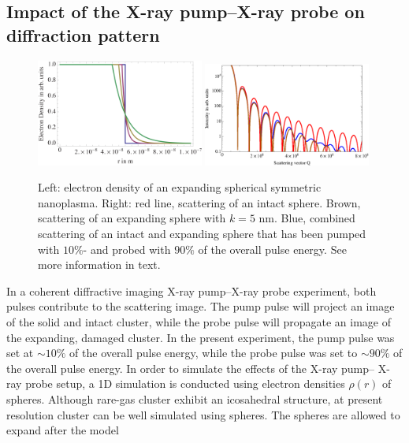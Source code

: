 \subsection{Impact of the X-ray pump--X-ray probe on diffraction pattern}\label{sec:pump--probe-considerations}
\begin{figure}
	\centering
		\includegraphics[width=0.49\textwidth]{images/electron-density-convoluted-object.png}
		\includegraphics[width=0.49\textwidth]{images/beam-convoluted-with-object.eps}
	\caption[Influence of X-ray pump--X-ray probe study in diffraction image.]{Left: electron density of an expanding spherical symmetric nanoplasma. Right: red line, scattering of an intact sphere. Brown, scattering of an expanding sphere with $k=5$ nm. Blue, combined scattering of an intact and expanding sphere that has been pumped with $10\%$- and probed with $90\%$ of the overall pulse energy. See more information in text.}
	\label{fig:electron-density-convoluted-object}
\end{figure}
In a coherent diffractive imaging X-ray pump--X-ray probe experiment, both pulses contribute to the scattering image. The pump pulse will project an image of the solid and intact cluster, while the probe pulse will propagate an image of the expanding, damaged cluster. In the present experiment, the pump pulse was set at $\sim10\%$ of the overall pulse energy, while the probe pulse was set to $\sim90\%$ of the overall pulse energy. In order to simulate the effects of the X-ray pump-- X-ray probe setup, a 1D simulation is conducted using electron densities $\rho\left(r\right)$ of spheres. Although rare-gas cluster exhibit an icosahedral structure, at present resolution cluster can be well simulated using spheres. The spheres are allowed to expand after the model
